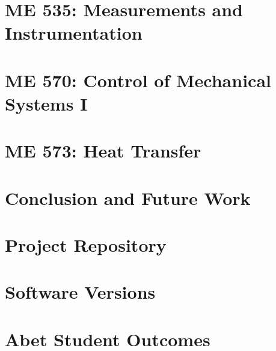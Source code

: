\documentclass[12pt]{report}
\begin{document}
    \chapter{ME 535: Measurements and Instrumentation}
    

    \chapter{ME 570: Control of Mechanical Systems I}
    

    \chapter{ME 573: Heat Transfer}
    
    
    \chapter{Conclusion and Future Work}
    

    \appendix
    \chapter{Project Repository}
    \label{appendix:appendix_github}
    

    \chapter{Software Versions}
    \label{appendix:appendix_versions}
    

    \chapter{Abet Student Outcomes}
    \label{appendix:appendix_abet}
    


    
\end{document}
